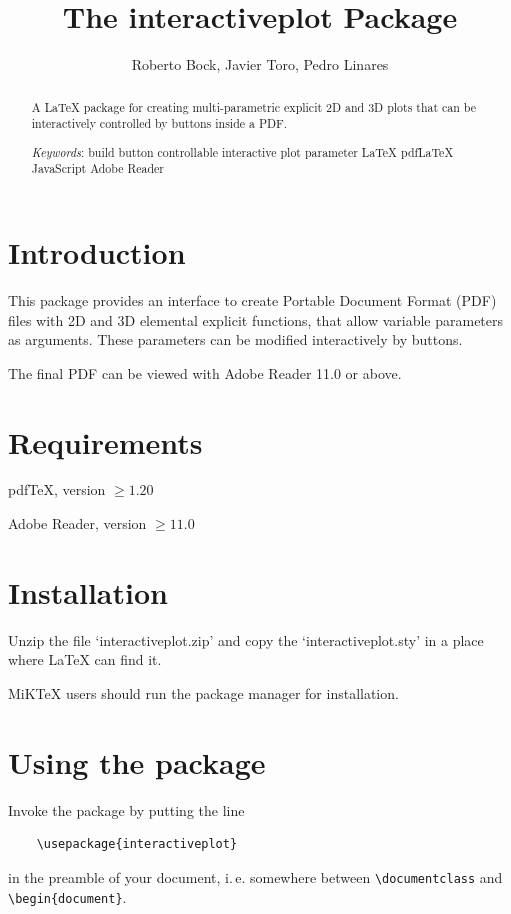 \documentclass[a4paper,12pt]{article}
\def\keywords{build button controllable interactive plot parameter LaTeX pdfLaTeX JavaScript Adobe Reader}
\begin{document}
\title{The {\sffamily interactiveplot} Package}
\author{Roberto Bock, Javier Toro, Pedro Linares}
\maketitle

\begin{abstract}\noindent
A \LaTeX{} package for creating multi-parametric explicit 2D and 3D plots that can be interactively controlled by buttons inside a PDF.
\baselineskip

\emph{Keywords}: \keywords
\end{abstract}

\tableofcontents

\section{Introduction}
This package provides an interface to create Portable Document Format (PDF) files with 2D and 3D elemental explicit functions, that allow variable parameters as arguments. These parameters can be modified interactively by buttons.


The final PDF can be viewed with Adobe Reader 11.0 or above.

\section{Requirements}
\begin{trivlist}
\item pdf\TeX{}, version $\ge1.20$
\item Adobe Reader, version $\ge11.0$
\end{trivlist}

\section{Installation}
Unzip the file `interactiveplot.zip' and copy the `interactiveplot.sty' in a place where \LaTeX{} can find it.

MiK\TeX{} users should run the package manager for installation.

\section{Using the package}
Invoke the package by putting the line
\begin{verbatim}
    \usepackage{interactiveplot}
\end{verbatim}
in the preamble of your document, i.\,e. somewhere between \verb+\documentclass+ and \verb+\begin{document}+.
\end{document}
